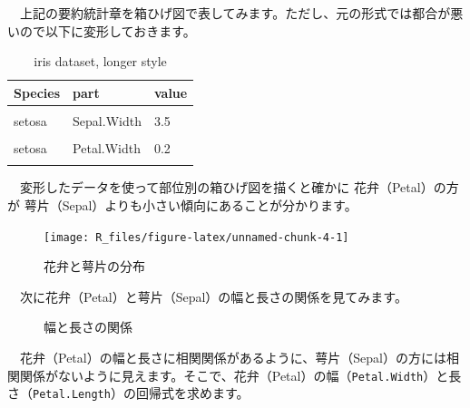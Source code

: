 \documentclass[
  12pt,
]{book}
\begin{document}
　上記の要約統計章を箱ひげ図で表してみます。ただし、元の形式では都合が悪いので以下に変形しておきます。

\begin{table}[H]

\caption{\label{tab:irislonger}iris dataset, longer style}
\centering
\begin{tabular}[t]{lll}
\toprule
Species & part & value\\
\midrule
\cellcolor{gray!6}{setosa} & \cellcolor{gray!6}{Sepal.Length} & \cellcolor{gray!6}{5.1}\\
setosa & Sepal.Width & 3.5\\
\cellcolor{gray!6}{setosa} & \cellcolor{gray!6}{Petal.Length} & \cellcolor{gray!6}{1.4}\\
setosa & Petal.Width & 0.2\\
\cellcolor{gray!6}{NA} & \cellcolor{gray!6}{NA} & \cellcolor{gray!6}{...}\\
\bottomrule
\end{tabular}
\end{table}

　変形したデータを使って部位別の箱ひげ図を描くと確かに 花弁（Petal）の方が 萼片（Sepal）よりも小さい傾向にあることが分かります。

\begin{figure}[H]

{\centering \texttt{[image: R\_files/figure-latex/unnamed-chunk-4-1]} 

}

\caption{花弁と萼片の分布}\label{fig:unnamed-chunk-4}
\end{figure}

　次に花弁（Petal）と萼片（Sepal）の幅と長さの関係を見てみます。

\begin{figure}[H]

{\centering {}

}

\caption{幅と長さの関係}\label{fig:unnamed-chunk-5}
\end{figure}

　花弁（Petal）の幅と長さに相関関係があるように、萼片（Sepal）の方には相関関係がないように見えます。そこで、花弁（Petal）の幅（\texttt{Petal.Width}）と長さ（\texttt{Petal.Length}）の回帰式を求めます。
\end{document}
